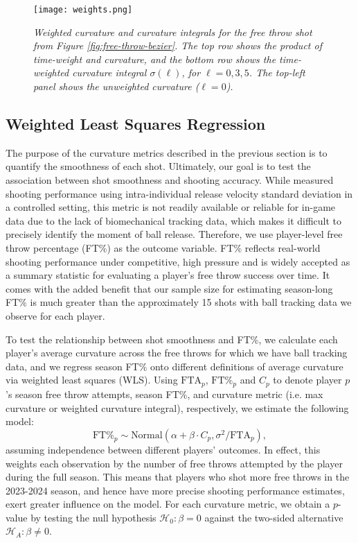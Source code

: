 \documentclass{article}
\begin{document}
          \begin{figure}[H]
              \centering
              \texttt{[image: weights.png]}
              \caption{\it Weighted curvature and curvature integrals for the free throw shot from Figure \ref{fig:free-throw-bezier}. The top row shows the product of time-weight and curvature, and the bottom row shows the time-weighted curvature integral \(\sigma(\ell)\), for \(\ell = 0, 3, 5\). The top-left panel shows the unweighted curvature (\(\ell = 0\)).}
              \label{fig:weights}
          \end{figure}

    \subsection{Weighted Least Squares Regression}

      The purpose of the curvature metrics described in the previous section is to quantify the smoothness of each shot. Ultimately, our goal is to test the association between shot smoothness and shooting accuracy. While \citet{slegers_role_2024} measured shooting performance using intra-individual release velocity standard deviation in a controlled setting, this metric is not readily available or reliable for in-game data due to the lack of biomechanical tracking data, which makes it difficult to precisely identify the moment of ball release. Therefore, we use player-level free throw percentage (FT\%) as the outcome variable. FT\% reflects real-world shooting performance under competitive, high pressure and is widely accepted as a summary statistic for evaluating a player’s free throw success over time. It comes with the added benefit that our sample size for estimating season-long FT\% is much greater than the approximately 15 shots with ball tracking data we observe for each player.

      To test the relationship between shot smoothness and FT\%, we calculate each player's average curvature across the free throws for which we have ball tracking data, and we regress season FT\% onto different definitions of average curvature via weighted least squares (WLS). Using \(\mbox{FTA}_p\), \(\mbox{FT\%}_p\) and \(C_p\) to denote player $p$'s season free throw attempts, season FT\%, and curvature metric (i.e. max curvature or weighted curvature integral), respectively, we estimate the following model:
      \begin{equation}
      \label{eqn:weighted-least-squares}
        \mbox{FT\%}_p \sim \mbox{Normal}(\alpha + \beta \cdot C_p, \sigma^2 / \mbox{FTA}_p),
      \end{equation}
      assuming independence between different players' outcomes. In effect, this weights each observation by the number of free throws attempted by the player during the full season. This means that players who shot more free throws in the 2023-2024 season, and hence have more precise shooting performance estimates, exert greater influence on the model. For each curvature metric, we obtain a $p$-value by testing the null hypothesis $\mathcal{H}_0: \beta = 0$ against the two-sided alternative $\mathcal{H}_A: \beta \ne 0$.
    
\end{document}
